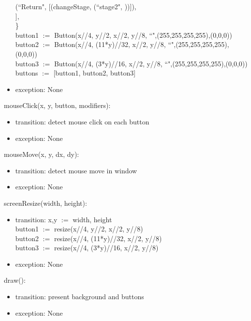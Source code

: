 \documentclass{article}
\begin{document}
\begin{itemize}
    \hspace*{3mm}\hspace*{3mm}(``Return", [(changeStage, (``stage2", ))]),\\
    \hspace*{3mm}],\\
    \}\\
    button1 $:=$ Button(x//4, y//2, x//2, y//8, ``",(255,255,255,255),(0,0,0))\\
    button2 $:=$ Button(x//4, (11*y)//32, x//2, y//8, ``",(255,255,255,255),(0,0,0))\\
    button3 $:=$ Button(x//4, (3*y)//16, x//2, y//8, ``",(255,255,255,255),(0,0,0))\\
    buttons $:=$ [button1, button2, button3]
\item exception: None
\end{itemize}\vspace{6mm}

\noindent mouseClick(x, y, button, modifiers):
\begin{itemize}
\item transition: detect mouse click on each button
\item exception: None
\end{itemize}\vspace{6mm}

\noindent mouseMove(x, y, dx, dy):
\begin{itemize}
\item transition: detect mouse move in window
\item exception: None
\end{itemize}\vspace{6mm}

\noindent screenResize(width, height):
\begin{itemize}
\item transition: x,y $:=$ width, height\\
    button1 $:=$ resize(x//4, y//2, x//2, y//8)\\
    button2 $:=$ resize(x//4, (11*y)//32, x//2, y//8)\\
    button3 $:=$ resize(x//4, (3*y)//16, x//2, y//8)
\item exception: None
\end{itemize}\vspace{6mm}

\noindent draw():
\begin{itemize}
\item transition: present background and buttons
\item exception: None
\end{itemize}\vspace{6mm}
\end{document}
